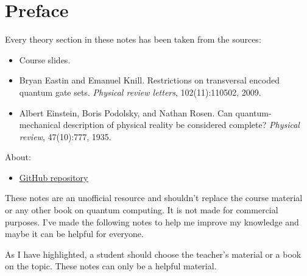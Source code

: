 \section*{Preface}

Every theory section in these notes has been taken from the sources:
\begin{itemize}
    \item Course slides.\cite{quantum-computing-polimi}
    \item Bryan Eastin and Emanuel Knill. Restrictions on transversal encoded quantum gate sets. \textit{Physical review letters}, 102(11):110502, 2009.\cite{eastin2009restrictions}
    \item Albert Einstein, Boris Podolsky, and Nathan Rosen. Can quantum-me\-chan\-i\-cal description of physical reality be considered complete? \textit{Physical review}, 47(10):777, 1935.\cite{einstein1935can}
\end{itemize}
About:
\begin{itemize}
    \item[\faIcon{github}] \href{https://github.com/PoliMI-HPC-E-notes-projects-AndreVale69/HPC-E-PoliMI-university-notes}{GitHub repository}
    \begin{center}
    \end{center}
\end{itemize}
These notes are an unofficial resource and shouldn't replace the course material or any other book on quantum computing. It is not made for commercial purposes. I've made the following notes to help me improve my knowledge and maybe it can be helpful for everyone.

As I have highlighted, a student should choose the teacher's material or a book on the topic. These notes can only be a helpful material.